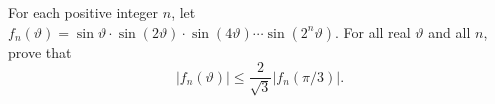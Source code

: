 \documentclass{article}
\begin{document}
\setlength{\parindent}{0pt}
For each positive integer $n$, let $f_{n}(\vartheta)=\sin \vartheta\cdot\sin(2\vartheta)\cdot\sin(4\vartheta)\cdots\sin(2^{n}\vartheta)$. For all real $\vartheta$ and all $n$, prove that$$|f_{n}(\vartheta)|\le\frac{2}{\sqrt{3}}|f_{n}(\pi/3)|.$$
\end{document}
